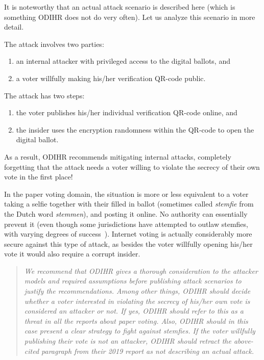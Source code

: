 \documentclass{llncs}
\begin{document}
It is noteworthy that an actual attack scenario is described here (which is something ODIHR does not do very often). Let us analyze this scenario in more detail. 

The attack involves two parties:
\begin{enumerate}
    \item  an internal attacker with privileged access to the digital ballots, and 
    \item  a voter willfully making his/her verification QR-code public.
\end{enumerate}
The attack has two steps:
\begin{enumerate}
    \item the voter publishes his/her individual verification QR-code online, and
    \item the insider uses the encryption randomness within the QR-code to open the digital ballot. 
\end{enumerate}

As a result, ODIHR recommends mitigating internal attacks, completely forgetting that the attack needs a voter willing to violate the secrecy of their own vote in the first place!

In the paper voting domain, the situation is more or less equivalent to a voter taking a selfie together with their filled in ballot (sometimes called \emph{stemfie} from the Dutch word \emph{stemmen}), and posting it online. No authority can essentially prevent it (even though some jurisdictions have attempted to outlaw stemfies, with varying degrees of success~\cite{koutsoulias2018ballot}). Internet voting is actually considerably more secure against this type of attack, as besides the voter willfully opening his/her vote it would also require a corrupt insider.

\begin{quote}
    \emph{We recommend that ODIHR gives a thorough consideration to the attacker models and required assumptions before publishing attack scenarios to justify the recommendations. Among other things, ODIHR should decide whether a voter interested in violating the secrecy of his/her own vote is considered an attacker or not. If yes, ODIHR should refer to this as a threat in all the reports about paper voting. Also, ODIHR should in this case present a clear strategy to fight against stemfies. If the voter willfully publishing their vote is not an attacker, ODIHR should retract the above-cited paragraph from their 2019 report as not describing an actual attack.}
\end{quote}
\end{document}
